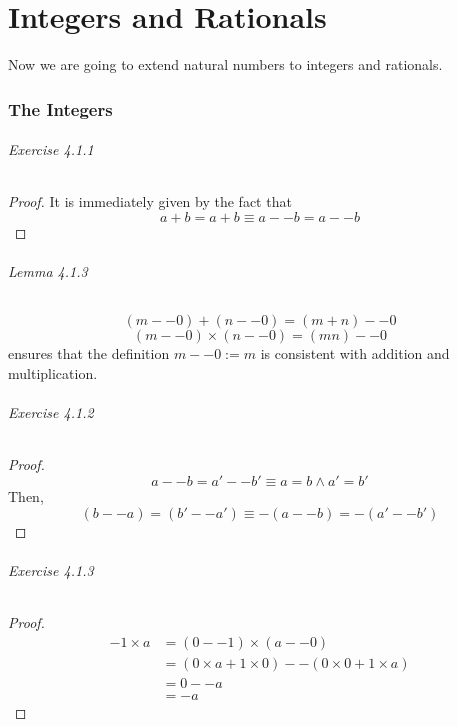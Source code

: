 
\part{Integers and Rationals}
Now we are going to extend natural numbers to integers and rationals.

\section{The Integers}

\paragraph{Exercise 4.1.1} \label{exercise4.1.1}
\begin{proof}
It is immediately given by the fact that 
\[
a+b = a+b \equiv a -- b = a -- b
\]
\end{proof}

\paragraph{Lemma 4.1.3}
\[
(m--0)+(n--0) = (m+n)--0
\]
\[
(m--0) \times (n--0) = (mn) -- 0
\]
ensures that the definition $m--0:=m$ is consistent with addition and multiplication.

\paragraph{Exercise 4.1.2} \label{exercise4.1.2}
\begin{proof}
\[
a--b = a'--b' \equiv a=b \wedge a'=b'
\]
Then, 
\[
(b--a) = (b'--a') \equiv -(a--b) = -(a'--b')
\]
\end{proof}

\paragraph{Exercise 4.1.3} \label{exercise4.1.3}
\begin{proof}
\begin{align*}
-1 \times a 
&= (0 -- 1) \times (a -- 0) \\
&= (0\times a + 1 \times 0) -- (0 \times 0 + 1 \times a) \\
&= 0 -- a \\
&= -a
\end{align*}
\end{proof}

